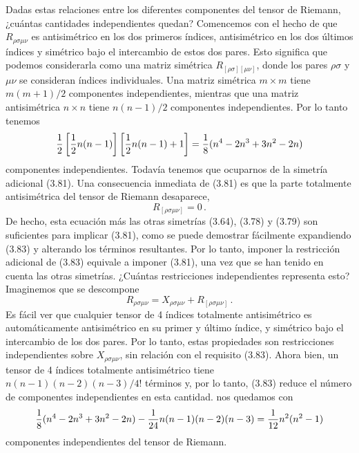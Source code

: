 \documentclass[11pt,b5paper,openany,twoside]{book}
\newcommand{\mn}{{\mu\nu}}
\begin{document}
Dadas estas relaciones entre los diferentes componentes del tensor de Riemann, ¿cuántas cantidades independientes quedan? Comencemos con el hecho de que $R_{\rho\sigma\mn}$ es antisimétrico en los dos primeros índices, antisimétrico en los dos últimos índices y simétrico bajo el intercambio de estos dos pares.
Esto significa que podemos considerarla como una matriz simétrica $R_{[\rho\sigma][\mn]}$, donde los pares $\rho\sigma$ y $\mu\nu$ se consideran índices individuales.
Una matriz simétrica $m\times m$ tiene $m(m+1)/2$ componentes independientes, mientras que una matriz antisimétrica $n\times n$ tiene $n(n-1)/2$ componentes independientes.
Por lo tanto tenemos
\begin{equation}
{1\over 2}\left[{1\over 2}n(n-1)\right]\left[{1\over 2}n(n-1)
+1\right] = {1\over 8}(n^4-2n^3+3n^2-2n)\label{3.82}
\end{equation}
componentes independientes.
Todavía tenemos que ocuparnos de la simetría adicional (3.81).
Una consecuencia inmediata de (3.81) es que la parte totalmente antisimétrica del tensor de Riemann desaparece,
\begin{equation}
R_{[\rho\sigma\mn]} =0 \,.\label{3.83}
\end{equation}
De hecho, esta ecuación más las otras simetrías (3.64), (3.78) y (3.79) son suficientes para implicar (3.81), como se puede demostrar fácilmente expandiendo (3.83) y alterando los términos resultantes.
Por lo tanto, imponer la restricción adicional de (3.83) equivale a imponer (3.81), una vez que se han tenido en cuenta las otras simetrías.
¿Cuántas restricciones independientes representa esto?
Imaginemos que se descompone
\begin{equation}
R_{\rho\sigma\mn}=X_{\rho\sigma\mn}+R_{[\rho\sigma\mn]}\,.
\label{3.84}
\end{equation}
Es fácil ver que cualquier tensor de 4 índices totalmente antisimétrico es automáticamente antisimétrico en su primer y último índice, y simétrico bajo el intercambio de los dos pares.
Por lo tanto, estas propiedades son restricciones independientes sobre $X_{\rho\sigma\mn}$, sin relación con el requisito (3.83).
Ahora bien, un tensor de 4 índices totalmente antisimétrico tiene $n(n-1)(n-2)(n-3)/4!$ términos y, por lo tanto, (3.83) reduce el número de componentes independientes en esta cantidad.
nos quedamos con
\begin{equation}
{1\over 8}(n^4-2n^3+3n^2-2n)-{1\over {24}}n(n-1)(n-2)(n-3) =
{1\over{12}}n^2(n^2-1)\label{3.85}
\end{equation}
componentes independientes del tensor de Riemann.
\end{document}
